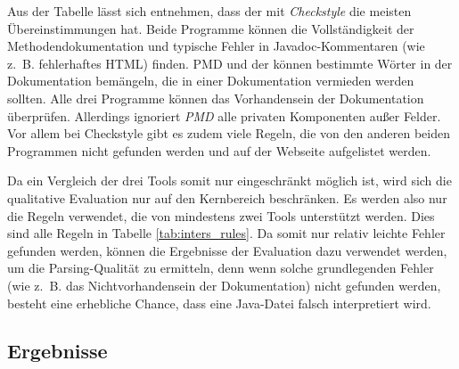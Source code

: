 Aus der Tabelle lässt sich entnehmen, dass der \doceval mit \textit{Checkstyle} die meisten Übereinstimmungen hat. Beide Programme können die Vollständigkeit der Methodendokumentation und typische Fehler in Javadoc-Kommentaren (wie z.~B. fehlerhaftes HTML) finden. PMD und der \doceval können bestimmte Wörter in der Dokumentation bemängeln, die in einer Dokumentation vermieden werden sollten. Alle drei Programme können das Vorhandensein der Dokumentation überprüfen. Allerdings ignoriert \textit{PMD} alle privaten Komponenten außer Felder. Vor allem bei Checkstyle gibt es zudem viele Regeln, die von den anderen beiden Programmen nicht gefunden werden und auf der Webseite \cite{checkstyle_doc_metrics} aufgelistet werden.

Da ein Vergleich der drei Tools somit nur eingeschränkt möglich ist, wird sich die qualitative Evaluation nur auf den Kernbereich beschränken. Es werden also nur die Regeln verwendet, die von mindestens zwei Tools unterstützt werden. Dies sind alle Regeln in Tabelle \ref{tab:inters_rules}. Da somit nur relativ leichte Fehler gefunden werden, können die Ergebnisse der Evaluation dazu verwendet werden, um die Parsing-Qualität zu ermitteln, denn wenn solche grundlegenden Fehler (wie z.~B. das Nichtvorhandensein der Dokumentation) nicht gefunden werden, besteht eine erhebliche Chance, dass eine Java-Datei falsch interpretiert wird. 



\subsection{Ergebnisse}

